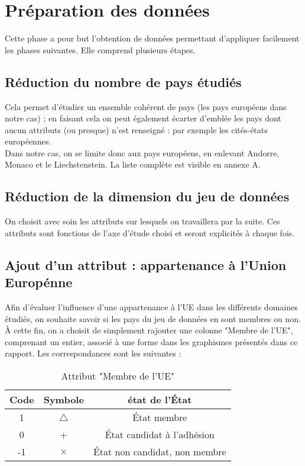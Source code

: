 \section{Préparation des données}

Cette phase a pour but l'obtention de données permettant d'appliquer
facilement les phases suivantes. Elle comprend plusieurs étapes. 


\subsection{Réduction du nombre de pays étudiés}

Cela permet d'étudier un ensemble cohérent de pays (les pays européens dans
notre cas) ; en faisant cela on peut également écarter d'emblée les pays
dont aucun attributs (ou presque) n'est renseigné : par exemple les
cités-états européennes.\\

Dans notre cas, on se limite donc aux pays européens, en enlevant Andorre,
Monaco et le Liechstenstein. La liste complète est visible en annexe A.


\subsection{Réduction de la dimension du jeu de données}

On choisit avec soin les attributs sur lesquels on travaillera par la
suite. Ces attributs sont fonctions de l'axe d'étude choisi et seront
explicités à chaque fois.


\subsection{Ajout d'un attribut : appartenance à l'Union Europénne}

Afin d'évaluer l'influence d'une appartenance à l'UE dans les différents
domaines étudiés, on souhaite savoir si les pays du jeu de données en sont
membres ou non. À cette fin, on a choisit de simplement rajouter une
colonne "Membre de l'UE", comprenant un entier, associé à une forme dans
les graphismes présentés dans ce rapport. Les correspondances sont les
suivantes :

\begin{table}[h]
\centering
\caption{Attribut "Membre de l'UE"}
\begin{tabular}{c|c|c}
Code & Symbole & état de l'État \\ \hline
1 & $\bigtriangleup$ & État membre \\ \hline
0 & + & État candidat à l'adhésion \\ \hline
-1 & $\times$ & État non candidat, non membre
\end{tabular}
\end{table}
